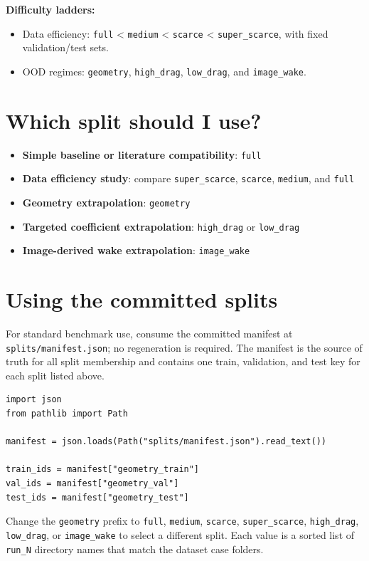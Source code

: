 \documentclass[10pt]{article}
\newcommand{\code}[1]{\texttt{#1}}
\newcommand{\splitkey}[1]{\texttt{#1}}
\begin{document}
\textbf{Difficulty ladders:}
\begin{itemize}
  \item Data efficiency: \splitkey{full} < \splitkey{medium} < \splitkey{scarce} < \splitkey{super\_scarce}, with fixed validation/test sets.
  \item OOD regimes: \splitkey{geometry}, \splitkey{high\_drag}, \splitkey{low\_drag}, and \splitkey{image\_wake}.
\end{itemize}

\section*{Which split should I use?}

\begin{itemize}
  \item \textbf{Simple baseline or literature compatibility}: \splitkey{full}
  \item \textbf{Data efficiency study}: compare \splitkey{super\_scarce}, \splitkey{scarce}, \splitkey{medium}, and \splitkey{full}
  \item \textbf{Geometry extrapolation}: \splitkey{geometry}
  \item \textbf{Targeted coefficient extrapolation}: \splitkey{high\_drag} or \splitkey{low\_drag}
  \item \textbf{Image-derived wake extrapolation}: \splitkey{image\_wake}
\end{itemize}

\section*{Using the committed splits}

For standard benchmark use, consume the committed manifest at
\code{splits/manifest.json}; no regeneration is required. The manifest is the
source of truth for all split membership and contains one train, validation,
and test key for each split listed above.

\begin{verbatim}
import json
from pathlib import Path

manifest = json.loads(Path("splits/manifest.json").read_text())

train_ids = manifest["geometry_train"]
val_ids = manifest["geometry_val"]
test_ids = manifest["geometry_test"]
\end{verbatim}

Change the \code{geometry} prefix to \code{full}, \code{medium},
\code{scarce}, \code{super\_scarce}, \code{high\_drag}, \code{low\_drag}, or
\code{image\_wake} to select a different split. Each value is a sorted list of
\code{run\_N} directory names that match the dataset case folders.
\end{document}
